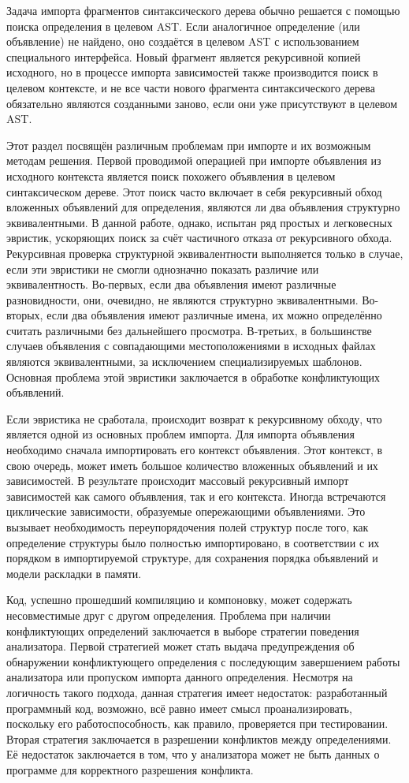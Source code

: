 Задача импорта фрагментов синтаксического дерева обычно решается с помощью поиска определения в целевом AST. Если аналогичное определение (или объявление) не найдено, оно создаётся в целевом AST с использованием специального интерфейса. Новый фрагмент является рекурсивной копией исходного, но в процессе импорта зависимостей также производится поиск в целевом контексте, и не все части нового фрагмента синтаксического дерева обязательно являются созданными заново, если они уже присутствуют в целевом AST.

Этот раздел посвящён различным проблемам при импорте и их возможным методам решения. Первой проводимой операцией при импорте объявления из исходного контекста является поиск похожего объявления в целевом синтаксическом дереве. Этот поиск часто включает в себя рекурсивный обход вложенных объявлений для определения, являются ли два объявления структурно эквивалентными. В данной работе, однако, испытан ряд простых и легковесных эвристик, ускоряющих поиск за счёт частичного отказа от рекурсивного обхода. Рекурсивная проверка структурной эквивалентности выполняется только в случае, если эти эвристики не смогли однозначно показать различие или эквивалентность. Во-первых, если два объявления имеют различные разновидности, они, очевидно, не являются структурно эквивалентными. Во-вторых, если два объявления имеют различные имена, их можно определённо считать различными без дальнейшего просмотра. В-третьих, в большинстве случаев объявления с совпадающими местоположениями в исходных файлах являются эквивалентными, за исключением специализируемых шаблонов. Основная проблема этой эвристики заключается в обработке конфликтующих объявлений.

Если эвристика не сработала, происходит возврат к рекурсивному обходу, что является одной из основных проблем импорта. Для импорта объявления необходимо сначала импортировать его контекст объявления. Этот контекст, в свою очередь, может иметь большое количество вложенных объявлений и их зависимостей. В результате происходит массовый рекурсивный импорт зависимостей как самого объявления, так и его контекста. Иногда встречаются циклические зависимости, образуемые опережающими объявлениями. Это вызывает необходимость переупорядочения  полей структур после того, как определение структуры было полностью импортировано, в соответствии с их порядком в импортируемой структуре, для сохранения порядка объявлений и модели раскладки в памяти.

Код, успешно прошедший компиляцию и компоновку, может содержать несовместимые друг с другом определения. Проблема при наличии конфликтующих определений заключается в выборе стратегии поведения анализатора. Первой стратегией может стать выдача предупреждения об обнаружении конфликтующего определения с последующим завершением работы анализатора или пропуском импорта данного определения. Несмотря на логичность такого подхода, данная стратегия имеет недостаток: разработанный программный код, возможно, всё равно имеет смысл проанализировать, поскольку его работоспособность, как правило, проверяется при тестировании. Вторая стратегия заключается в разрешении конфликтов между определениями. Её недостаток заключается в том, что у анализатора может не быть данных о программе для корректного разрешения конфликта.


